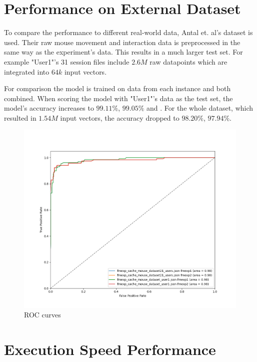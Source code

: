 \documentclass[
    fontsize=12pt,
    headings=small,
    parskip=half,           %
    bibliography=totoc,
    numbers=noenddot,       %
    open=any,               %
    final                   %
]{scrreprt}
\begin{document}
\section{Performance on External Dataset}


To compare the performance to different real-world data, Antal et. al's dataset \cite{9111596} is used. Their raw mouse movement and interaction data is preprocessed in the same way as the experiment's data. This results in a much larger test set. For example "User1"'s 31 session files include $2.6M$ raw datapoints which are integrated into $64k$ input vectors.

For comparison the model is trained on data from each instance and both combined. When scoring the model with "User1"'s data as the test set, the model's accuracy increases to $99.11\%$, $99.05\%$ and \todo. For the whole dataset, which resulted in $1.54M$ input vectors, the accuracy dropped to $98.20\%$, $97.94\%$.

\begin{figure}[h]
	\includegraphics[width=\textwidth]{figures/roc_both_datasets_both_instances.png}
	\caption{ROC curves}
	\label{fig:roc_both_datasets_both_instances}
\end{figure}


\section{Execution Speed Performance}
\end{document}
